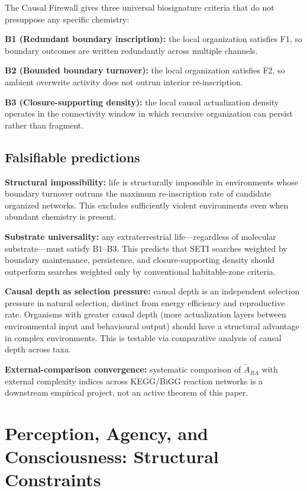 \documentclass[11pt]{article}
\def\mathrm#1{#1}%
\begin{document}
The Causal Firewall gives three universal biosignature criteria that do not presuppose any specific chemistry:

\textbf{B1 (Redundant boundary inscription):} the local organization satisfies F1, so boundary outcomes are written redundantly across multiple channels.

\textbf{B2 (Bounded boundary turnover):} the local organization satisfies F2, so ambient overwrite activity does not outrun interior re-inscription.

\textbf{B3 (Closure-supporting density):} the local causal actualization density operates in the connectivity window in which recursive organization can persist rather than fragment.

\subsection{Falsifiable predictions}

\textbf{Structural impossibility:} life is structurally impossible in environments whose boundary turnover outruns the maximum re-inscription rate of candidate organized networks. This excludes sufficiently violent environments even when abundant chemistry is present.

\textbf{Substrate universality:} any extraterrestrial life---regardless of molecular substrate---must satisfy B1--B3. This predicts that SETI searches weighted by boundary maintenance, persistence, and closure-supporting density should outperform searches weighted only by conventional habitable-zone criteria.

\textbf{Causal depth as selection pressure:} causal depth is an independent selection pressure in natural selection, distinct from energy efficiency and reproductive rate. Organisms with greater causal depth (more actualization layers between environmental input and behavioural output) should have a structural advantage in complex environments. This is testable via comparative analysis of causal depth across taxa.

\textbf{External-comparison convergence:} systematic comparison of $\tilde{A}_{\mathrm{RA}}$ with external complexity indices across KEGG/BiGG reaction networks is a downstream empirical project, not an active theorem of this paper.

\section{Perception, Agency, and Consciousness: Structural Constraints}
\label{sec:consciousness}
\end{document}
